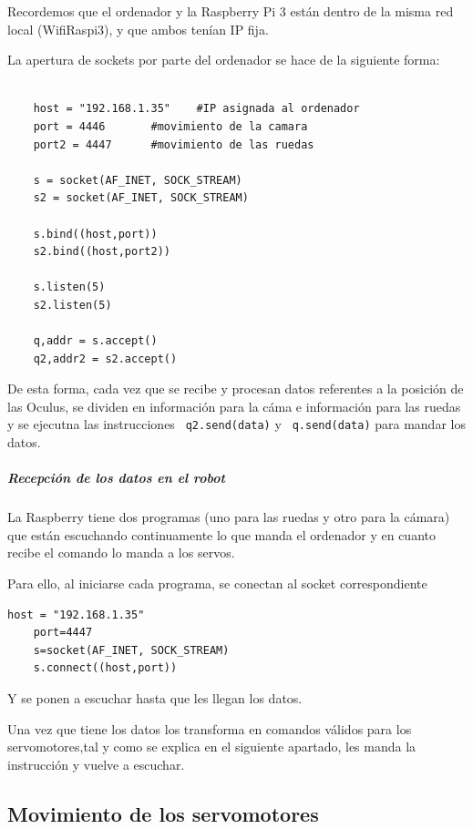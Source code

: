 \documentclass[twoside, 11pt]{epstfg}
\begin{document}
Recordemos que el ordenador y la Raspberry Pi 3 están dentro de la misma red local (WifiRaspi3), y que ambos tenían IP fija.

La apertura de sockets por parte del ordenador se hace de la siguiente forma:

\lstset{language=python, breaklines=true, basicstyle=\footnotesize}
\begin{lstlisting}[frame=single]

	host = "192.168.1.35"    #IP asignada al ordenador
	port = 4446       #movimiento de la camara
	port2 = 4447      #movimiento de las ruedas

	s = socket(AF_INET, SOCK_STREAM)
	s2 = socket(AF_INET, SOCK_STREAM)

	s.bind((host,port))
	s2.bind((host,port2))

	s.listen(5)
	s2.listen(5)

	q,addr = s.accept()
	q2,addr2 = s2.accept()

\end{lstlisting}

De esta forma, cada vez que se recibe y procesan datos referentes a la posición de las Oculus, se dividen en información para la cáma e información para las ruedas y se ejecutna las instrucciones \texttt{ q2.send(data)}  y \texttt{ q.send(data)} para mandar los datos.
\subparagraph{Recepción de los datos en el robot}

La Raspberry tiene dos programas (uno para las ruedas y otro para la
cámara) que están escuchando continuamente lo que manda el ordenador y en
cuanto recibe el comando lo manda a los servos.

Para ello, al iniciarse cada programa, se conectan al socket correspondiente
\lstset{language=python, breaklines=true, basicstyle=\footnotesize}
\begin{lstlisting}[frame=single]
	host = "192.168.1.35"
	port=4447
	s=socket(AF_INET, SOCK_STREAM)
	s.connect((host,port))
\end{lstlisting}

Y se ponen a escuchar hasta que les llegan los datos.

Una vez que tiene los datos los transforma en comandos válidos para los servomotores,tal y como se explica en el siguiente apartado, les manda la instrucción y vuelve a escuchar.


\subsection{Movimiento de los servomotores}
\end{document}
